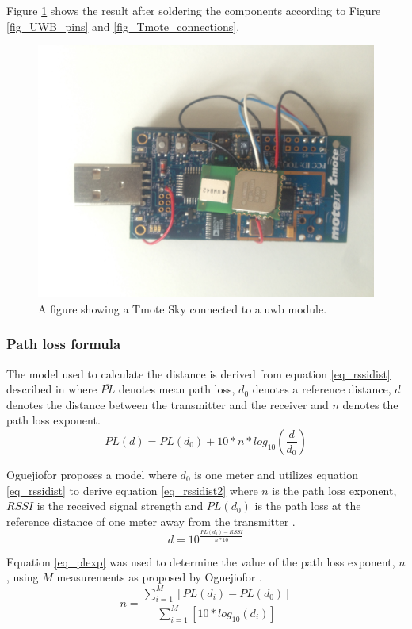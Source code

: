 			Figure \ref{fig_Tmote_UWB} shows the result after soldering the components according to Figure \ref{fig_UWB_pins} and \ref{fig_Tmote_connections}.
			\begin{figure}[H] 
			  \centering
			      \includegraphics[height=0.45\textwidth]{img/Tmote-UWB}
			  \caption{A figure showing a Tmote Sky connected to a \gls{uwb} module.}
			  \label{fig_Tmote_UWB}
			\end{figure}
		\subsubsection{Path loss formula}
		The model used to calculate the distance is derived from equation \ref{eq_rssidist} described in \cite{seidel_914_1992} where $\overline{PL}$ denotes mean path loss, $d_0$ denotes a reference distance, $d$ denotes the distance between the transmitter and the receiver and $n$ denotes the path loss exponent. 
		\begin{equation} \label{eq_rssidist}
			\overline{PL}(d) = PL(d_0) + 10 * n * log_{10}(\frac{d}{d_0})
		\end{equation}

		Oguejiofor proposes a model where $d_0$ is one meter and utilizes equation \ref{eq_rssidist} to derive equation \ref{eq_rssidist2} where $n$ is the path loss exponent, $RSSI$ is the received signal strength and $PL(d_0)$ is the path loss at the reference distance of one meter away from the transmitter \cite{oguejiofor_trilateration_2013}. 
		\begin{equation} \label{eq_rssidist2}
			d = 10^{\frac{PL(d_0)-RSSI}{n*10}}
		\end{equation}

		Equation \ref{eq_plexp} was used to determine the value of the path loss exponent, $n$, using $M$ measurements as proposed by Oguejiofor \cite{oguejiofor_trilateration_2013}.
		\begin{equation} \label{eq_plexp}
			n = \frac{\sum_{i=1}^{M}[PL(d_i)-PL(d_0)]}{\sum_{i=1}^{M}[10*log_{10}(d_i)]}
		\end{equation}

